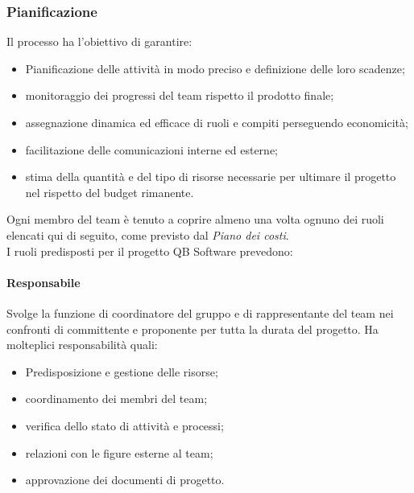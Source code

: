     \subsubsection{Pianificazione}\label{sec:planning}
        Il processo ha l'obiettivo di garantire:
        \begin{itemize}
            \item Pianificazione delle attività in modo preciso e definizione delle loro scadenze;
            \item monitoraggio dei progressi del team rispetto il prodotto finale;
            \item assegnazione dinamica ed efficace di ruoli e compiti perseguendo economicità;
            \item facilitazione delle comunicazioni interne ed esterne;
            \item stima della quantità e del tipo di risorse necessarie per ultimare il progetto nel rispetto del budget rimanente.
        \end{itemize}
        Ogni membro del team è tenuto a coprire almeno una volta ognuno dei ruoli elencati qui di seguito, come previsto dal \emph{Piano dei costi}.\\
        I ruoli predisposti per il progetto QB Software prevedono:
        
        \paragraph{Responsabile}
            Svolge la funzione di coordinatore del gruppo e di rappresentante del team nei confronti di committente e proponente per tutta la durata del progetto. Ha molteplici responsabilità quali:
            \begin{itemize}
                \item Predisposizione e gestione delle risorse;
                \item coordinamento dei membri del team;
                \item verifica dello stato di attività e processi;
                \item relazioni con le figure esterne al team;
                \item approvazione dei documenti di progetto.
            \end{itemize}
